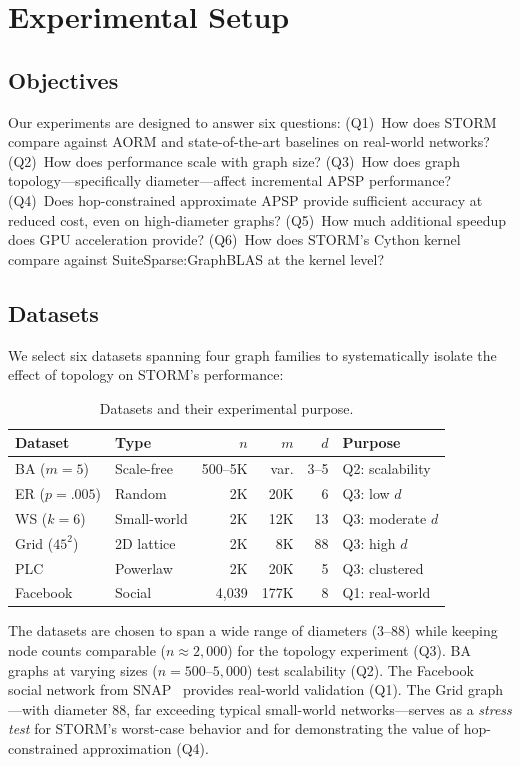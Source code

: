 \documentclass[journal]{IEEEtran}
\begin{document}
\section{Experimental Setup}

\subsection{Objectives}

Our experiments are designed to answer six questions: (Q1)~How does STORM compare against AORM and state-of-the-art baselines on real-world networks? (Q2)~How does performance scale with graph size? (Q3)~How does graph topology---specifically diameter---affect incremental APSP performance? (Q4)~Does hop-constrained approximate APSP provide sufficient accuracy at reduced cost, even on high-diameter graphs? (Q5)~How much additional speedup does GPU acceleration provide? (Q6)~How does STORM's Cython kernel compare against SuiteSparse:GraphBLAS at the kernel level?

\subsection{Datasets}

We select six datasets spanning four graph families to systematically isolate the effect of topology on STORM's performance:

\begin{table}[t]
\centering
\caption{Datasets and their experimental purpose.}
\label{tab:datasets}
\setlength{\tabcolsep}{2.5pt}
\begin{tabular}{@{}llrrrl@{}}
\toprule
\textbf{Dataset} & \textbf{Type} & $n$ & $m$ & $d$ & \textbf{Purpose} \\
\midrule
BA ($m\!=\!5$) & Scale-free & 500--5K & var. & 3--5 & Q2: scalability \\
ER ($p\!=\!.005$) & Random & 2K & 20K & 6 & Q3: low $d$ \\
WS ($k\!=\!6$) & Small-world & 2K & 12K & 13 & Q3: moderate $d$ \\
Grid ($45^2$) & 2D lattice & 2K & 8K & 88 & Q3: high $d$ \\
PLC & Powerlaw & 2K & 20K & 5 & Q3: clustered \\
Facebook & Social & 4,039 & 177K & 8 & Q1: real-world \\
\bottomrule
\end{tabular}
\end{table}

The datasets are chosen to span a wide range of diameters (3--88) while keeping node counts comparable ($n \approx 2{,}000$) for the topology experiment (Q3). BA graphs at varying sizes ($n = 500$--$5{,}000$) test scalability (Q2). The Facebook social network from SNAP~\cite{snap} provides real-world validation (Q1). The Grid graph---with diameter 88, far exceeding typical small-world networks---serves as a \emph{stress test} for STORM's worst-case behavior and for demonstrating the value of hop-constrained approximation (Q4).
\end{document}
